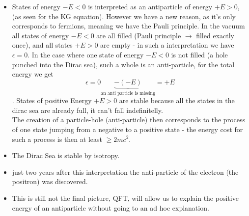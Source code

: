 \documentclass{report}
\begin{document}
\begin{itemize}
  \item States of energy $-E < 0$ is interpreted as an antiparticle of energy $+E>0$, (as seen for the KG equation). However we have a new reason, as it's only corresponds to fermions, meaning we have the Pauli principle. In the vacuum all states of energy $-E<0$ are all filled (Pauli principle $\to $ filled exactly once), and all states $+E>0$ are empty - in such a interpretation we have $\epsilon = 0$. In the case where one state of energy $-E<0$ is not filled (a hole punched into the Dirac sea), such a whole is an anti-particle, for the total energy we get  \[
      \epsilon = 0 \underbrace{- \left( -E \right) }_{\text{an anti particle is missing}} = +E
  \] . States of positive Energy $+E>0$ are stable because all the states in the dirac sea are already full, it can't fall indefinitelly.\\
  The creation of a particle-hole (anti-particle) then corresponds to the process of one state jumping from a negative to a positive state - the energy cost for such a process is then at least $\ge 2mc^2$.
\item The Dirac Sea is stable by isotropy.
\item just two years after this interpretation the anti-particle of the electron (the positron) was discovered.
\item This is still not the final picture, QFT, will allow us to explain the positive energy of an antiparticle without going to an ad hoc explanation.
\end{itemize}
\end{document}
